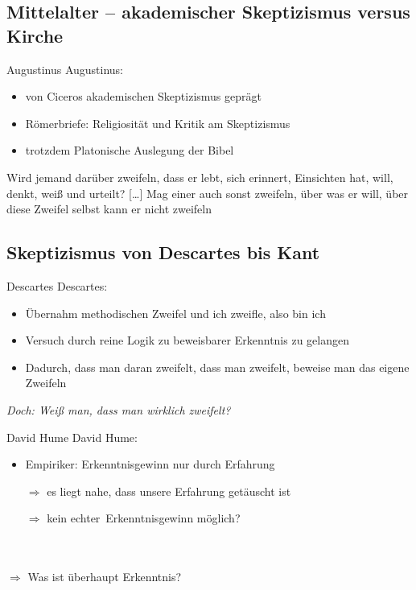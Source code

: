 \documentclass[12pt]{beamer}
\begin{document}
\subsection{Mittelalter – akademischer Skeptizismus versus Kirche}
\begin{frame}{Augustinus}
Augustinus:
\begin{itemize}
\item von Ciceros akademischen Skeptizismus geprägt
\item \glqq Römerbriefe\grqq : Religiosität und Kritik am Skeptizismus
\item trotzdem Platonische Auslegung der Bibel
\end{itemize}
\glqq Wird jemand darüber zweifeln, dass er lebt, sich erinnert, Einsichten hat, will, denkt, weiß und urteilt? [\ldots] Mag einer auch sonst zweifeln, über was er will, über diese Zweifel selbst kann er nicht zweifeln\grqq
\end{frame}
\subsection{Skeptizismus von Descartes bis Kant}
\begin{frame}{Descartes}
Descartes:
\begin{itemize}
\item Übernahm  methodischen Zweifel und  \glqq ich zweifle, also bin ich\grqq
\item Versuch durch reine Logik zu beweisbarer Erkenntnis zu gelangen
\item Dadurch, dass man daran zweifelt, dass man zweifelt, beweise man das eigene Zweifeln
\end{itemize}
\emph{Doch: Weiß man, dass man wirklich zweifelt?}
\end{frame}

\begin{frame}{David Hume}
David Hume:
\begin{itemize}
\item Empiriker: Erkenntnisgewinn nur durch Erfahrung
\item[$\Rightarrow$] es liegt nahe, dass unsere Erfahrung getäuscht ist
\item[$\Rightarrow$] kein \glqq echter\grqq\ Erkenntnisgewinn möglich?
\end{itemize}
\ \\
\ \\
$\Rightarrow$ Was ist überhaupt \glqq Erkenntnis\grqq ?
\end{frame}
\end{document}
